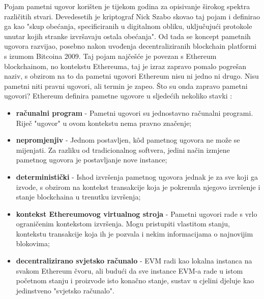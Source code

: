\documentclass[times, utf8, diplomski]{fer}
\begin{document}
Pojam pametni ugovor korišten je tijekom godina za opisivanje širokog spektra različitih stvari. Devedesetih je kriptograf Nick Szabo skovao taj pojam i definirao ga kao "skup obećanja, specificiranih u digitalnom obliku, uključujući protokole unutar kojih stranke izvršavaju ostala obećanja". Od tada se koncept pametnih ugovora razvijao,  posebno nakon uvođenja decentraliziranih blockchain platformi s izumom Bitcoina 2009. Taj pojam najčešće je povezan s Ethereum blockchainom, no kontekstu Ethereuma, taj je izraz zapravo pomalo pogrešan naziv, s obzirom na to da pametni ugovori Ethereum nisu ni jedno ni drugo. Nisu pametni niti pravni ugovori, ali termin je zapeo.
Što su onda zapravo pametni ugovori? Ethereum definira pametne ugovore u sljedećih nekoliko stavki \cite{ethereum-smart-contract}:

\begin{itemize}

\item \textbf{računalni program} - Pametni ugovori su jednostavno računalni programi. Riječ "ugovor" u ovom kontekstu nema pravno značenje;

\item \textbf{nepromjenjiv} - Jednom postavljen, kôd pametnog ugovora ne može se mijenjati. Za razliku od tradicionalnog softvera, jedini način izmjene pametnog ugovora je postavljanje nove instance;

\item \textbf{deterministički} - Ishod izvršenja pametnog ugovora jednak je za sve koji ga izvode, s obzirom na kontekst transakcije koja je pokrenula njegovo izvršenje i stanje blockchaina u trenutku izvršenja;

\item \textbf{kontekst Ethereumovog virtualnog stroja} - Pametni ugovori rade s vrlo ograničenim kontekstom izvršenja. Mogu pristupiti vlastitom stanju, kontekstu transakcije koja ih je pozvala i nekim informacijama o najnovijim blokovima;

\item \textbf{decentralizirano svjetsko računalo} - EVM radi kao lokalna instanca na svakom Ethereum čvoru, ali budući da sve instance EVM-a rade u istom početnom stanju i proizvode isto konačno stanje, sustav u cjelini djeluje kao jedinstveno "svjetsko računalo".

\end{itemize}
\end{document}

